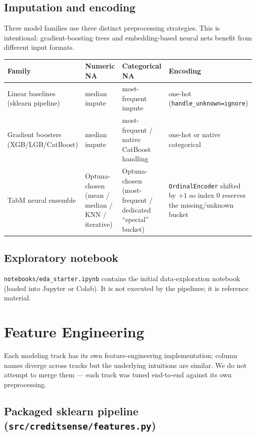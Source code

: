 \documentclass[11pt,a4paper]{article}
\begin{document}
\subsection{Imputation and encoding}

Three model families use three distinct preprocessing strategies. This is intentional: gradient-boosting trees and embedding-based neural nets benefit from different input formats.

\begin{table}[h]
\centering
\small
\begin{tabularx}{\linewidth}{lXXX}
\toprule
\textbf{Family} & \textbf{Numeric NA} & \textbf{Categorical NA} & \textbf{Encoding} \\
\midrule
Linear baselines (sklearn pipeline) & median impute & most-frequent impute & one-hot (\texttt{handle\_unknown=ignore}) \\
Gradient boosters (XGB/LGB/CatBoost) & median impute & most-frequent / native CatBoost handling & one-hot or native categorical \\
TabM neural ensemble & Optuna-chosen (mean / median / KNN / iterative) & Optuna-chosen (most-frequent / dedicated ``special'' bucket) & \texttt{OrdinalEncoder} shifted by $+1$ so index 0 reserves the missing/unknown bucket \\
\bottomrule
\end{tabularx}
\end{table}

\subsection{Exploratory notebook}

\texttt{notebooks/eda\_starter.ipynb} contains the initial data-exploration notebook (loaded into Jupyter or Colab). It is not executed by the pipelines; it is reference material.

\section{Feature Engineering}\label{sec:fe}

Each modeling track has its own feature-engineering implementation; column names diverge across tracks but the underlying intuitions are similar. We do not attempt to merge them --- each track was tuned end-to-end against its own preprocessing.

\subsection{Packaged sklearn pipeline (\texttt{src/creditsense/features.py})}
\end{document}
